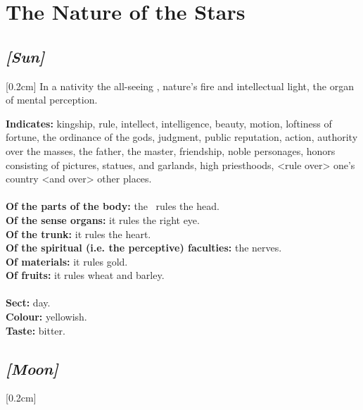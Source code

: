 
\section{The Nature of the Stars}

\subsection{\textit{[Sun]}}
[0.2cm]
In a nativity the all-seeing 
\Sun{}, nature’s fire and intellectual light, the organ of mental perception.

\textbf{Indicates:} kingship, rule, intellect, intelligence, beauty, motion, loftiness of fortune, the ordinance of the gods, judgment, public reputation, action, authority over the masses, the father, the master, friendship, noble personages, honors consisting of pictures, statues, and garlands, high priesthoods, <rule over> one’s country <and over> other places. \\
\\
\textbf{Of the parts of the body:} the \Sun\, rules the head. \\
\textbf{Of the sense organs:} it rules the right eye. \\
\textbf{Of the trunk:} it rules the heart.\\
\textbf{Of the spiritual (i.e. the perceptive) faculties:} the nerves.\\
\textbf{Of materials:} it rules gold. \\
\textbf{Of fruits:} it rules wheat and barley. \\
\\
\textbf{Sect:} day. \\
\textbf{Colour:} yellowish. \\
\textbf{Taste:} bitter.
\secbr
\subsection{\textit{[Moon]}}
[0.2cm]

